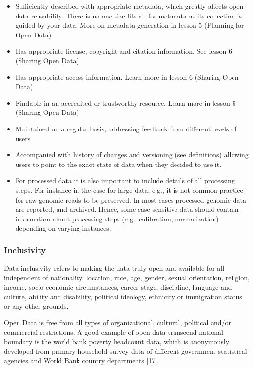 \documentclass[
  letterpaper,
  DIV=11,
  numbers=noendperiod]{scrreport}
\providecommand{\tightlist}{%
  \setlength{\itemsep}{0pt}\setlength{\parskip}{0pt}}\usepackage{longtable,booktabs,array}
\begin{document}
\begin{itemize}
\tightlist
\item
  Sufficiently described with appropriate metadata, which greatly
  affects open data reusability. There is no one size fits all for
  metadata as its collection is guided by your data. More on metadata
  generation in lesson 5 (Planning for Open Data)
\item
  Has appropriate license, copyright and citation information. See
  lesson 6 (Sharing Open Data)
\item
  Has appropriate access information. Learn more in lesson 6 (Sharing
  Open Data)
\item
  Findable in an accredited or trustworthy resource. Learn more in
  lesson 6 (Sharing Open Data)
\item
  Maintained on a regular basis, addressing feedback from different
  levels of users
\item
  Accompanied with history of changes and versioning (see definitions)
  allowing users to point to the exact state of data when they decided
  to use it.
\item
  For processed data it is also important to include details of all
  processing steps. For instance in the case for large data, e.g., it is
  not common practice for raw genomic reads to be preserved. In most
  cases processed genomic data are reported, and archived. Hence, some
  case sensitive data should contain information about processing steps
  (e.g., calibration, normalization) depending on varying instances.
\end{itemize}

\hypertarget{inclusivity}{%
\subsubsection*{Inclusivity}\label{inclusivity}}

Data inclusivity refers to making the data truly open and available for
all independent of nationality, location, race, age, gender, sexual
orientation, religion, income, socio-economic circumstances, career
stage, discipline, language and culture, ability and disability,
political ideology, ethnicity or immigration status or any other
grounds.

Open Data is free from all types of organizational, cultural, political
and/or commercial restrictions. A good example of open data transcend
national boundary is the
\href{https://data.worldbank.org/indicator/SI.POV.DDAY?locations=1W\&start=1981\&end=2015\&view=chart}{world
bank poverty} headcount data, which is anonymously developed from
primary household survey data of different government statistical
agencies and World Bank country departments
{[}\href{https://data.worldbank.org/indicator/SI.POV.DDAY?locations=1W\&start=1981\&end=2015\&view=chart}{17}{]}.
\end{document}
